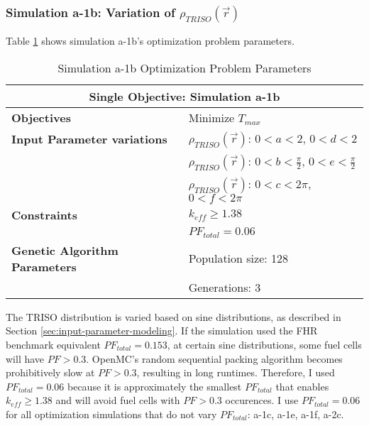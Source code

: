 \subsubsection{Simulation a-1b: Variation of $\rho_{TRISO}(\vec{r})$}
Table \ref{tab:simulationa1b} shows simulation a-1b's optimization problem parameters. 
\begin{table}[htbp!]
    \centering
    \onehalfspacing
    \caption{Simulation a-1b Optimization Problem Parameters}
	\label{tab:simulationa1b}
    \footnotesize
    \begin{tabular}{l|p{5.3cm}}
    \hline 
    \multicolumn{2}{c}{\textbf{Single Objective: Simulation a-1b}} \\
    \hline 
    \textbf{Objectives} & Minimize $T_{max}$ \\
    \hline 
    \textbf{Input Parameter variations} 
    & $\rho_{TRISO}(\vec{r})$: $0<a<2$, $0<d<2$\\
    & $\rho_{TRISO}(\vec{r})$: $0<b<\frac{\pi}{2}$, $0<e<\frac{\pi}{2}$\\
    & $\rho_{TRISO}(\vec{r})$: $0<c<2\pi$, $0<f<2\pi$\\
    \hline
    \textbf{Constraints} & $k_{eff} \geq 1.38$\\ 
    & $PF_{total} = 0.06 $\\ 
    \hline 
    \textbf{Genetic Algorithm Parameters} & Population size: 128 \\
    & Generations: 3 \\
    \hline
    \end{tabular}
\end{table}

The TRISO distribution is varied based on sine distributions, as described 
in Section \ref{sec:input-parameter-modeling}. 
If the simulation used the FHR benchmark equivalent $PF_{total} = 0.153$, at
certain sine distributions, some fuel cells will have $PF > 0.3$. 
OpenMC's random sequential packing algorithm becomes prohibitively slow at $PF > 0.3$, 
resulting in long runtimes. 
Therefore, I used $PF_{total} = 0.06$ because it is approximately the smallest 
$PF_{total}$ that enables $k_{eff} \geq 1.38$ and will avoid fuel cells with 
$PF > 0.3$ occurences. 
I use $PF_{total} = 0.06$ for all optimization simulations that do not vary 
$PF_{total}$: a-1c, a-1e, a-1f, a-2c. 

